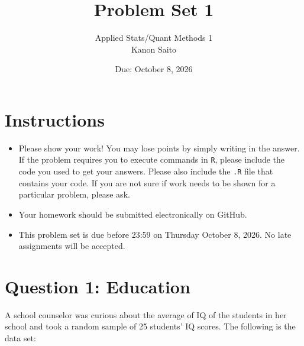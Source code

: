 \documentclass[12pt,letterpaper]{article}
\title{Problem Set 1}
\date{Due: October 8, 2026}
\author{
	Applied Stats/Quant Methods 1\\
	Kanon Saito
	}
\begin{document}
	\maketitle
	
	\section*{Instructions}
	\begin{itemize}
	\item Please show your work! You may lose points by simply writing in the answer. If the problem requires you to execute commands in \texttt{R}, please include the code you used to get your answers. Please also include the \texttt{.R} file that contains your code. If you are not sure if work needs to be shown for a particular problem, please ask.
\item Your homework should be submitted electronically on GitHub.
\item This problem set is due before 23:59 on Thursday October 8, 2026. No late assignments will be accepted.
	\end{itemize}
	
	\vspace{1cm}
	\section*{Question 1: Education}

A school counselor was curious about the average of IQ of the students in her school and took a random sample of 25 students' IQ scores. The following is the data set:\\
\vspace{.5cm}

  

\vspace{.5cm}
\end{document}
